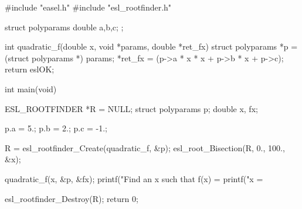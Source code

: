 \begin{cchunk}
#include "easel.h"
#include "esl_rootfinder.h"

struct polyparams { double a,b,c; };

int quadratic_f(double x, void *params, double *ret_fx)
{
  struct polyparams *p = (struct polyparams *) params;
  *ret_fx = (p->a * x * x + p->b * x + p->c);
  return eslOK;
}

int main(void)
{
  ESL_ROOTFINDER *R = NULL;
  struct polyparams p;
  double x, fx;

  p.a = 5.;
  p.b = 2.;
  p.c = -1.;

  R = esl_rootfinder_Create(quadratic_f, &p);
  esl_root_Bisection(R, 0., 100., &x);

  quadratic_f(x, &p, &fx);
  printf("Find an x such that f(x) = %
  printf("x = %

  esl_rootfinder_Destroy(R);
  return 0;
}
\end{cchunk}
